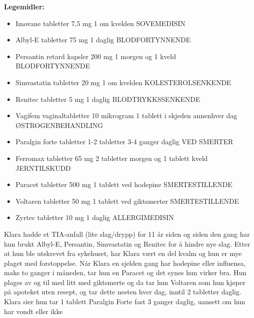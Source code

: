 \textbf{Legemidler:}
\begin{itemize}
\item Imovane tabletter 7,5 mg 1 om kvelden SOVEMEDISIN 
\item Albyl-E tabletter 75  mg 1 daglig BLODFORTYNNENDE
\item Persantin retard kapsler 200 mg 1 morgen og 1 kveld BLODFORTYNNENDE
\item Simvastatin tabletter 20 mg 1 om kvelden KOLESTEROLSENKENDE
\item Renitec tabletter 5 mg 1 daglig BLODTRYKKSSENKENDE
\item Vagifem vaginaltabletter 10 mikrogram 1 tablett i skjeden annenhver dag ØSTROGENBEHANDLING
\item Paralgin forte tabletter 1-2 tabletter 3-4 ganger daglig VED SMERTER
\item Ferromax tabletter 65 mg 2 tabletter morgen og 1 tablett kveld JERNTILSKUDD
\item Paracet tabletter 500 mg  1 tablett ved hodepine SMERTESTILLENDE 
\item Voltaren tabletter 50 mg 1 tablett ved giktsmerter SMERTESTILLENDE 
\item Zyrtec tabletter 10 mg 1 daglig ALLERGIMEDISIN
\end{itemize}

Klara hadde et TIA-anfall (lite slag/drypp) for 11 år siden og siden den gang har hun brukt Albyl-E, Persantin, Simvastatin og Renitec for å hindre nye slag. Etter at hun ble utskrevet fra sykehuset, har Klara vært en del kvalm og hun er mye plaget med forstoppelse. Når Klara en sjelden gang har hodepine eller influensa, maks to ganger i måneden, tar hun en Paracet og det synes hun virker bra. Hun plages av og til med litt med giktsmerte og da tar hun Voltaren som hun kjøper på apoteket uten resept, og tar dette nesten hver dag, inntil 2 tabletter daglig. Klara sier hun tar 1 tablett Paralgin Forte fast 3 ganger daglig, uansett om hun har vondt eller ikke

